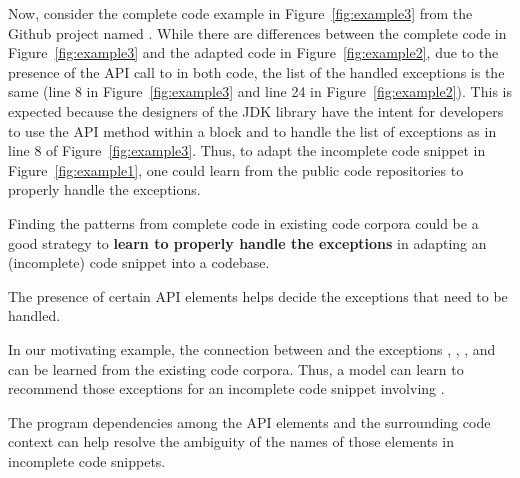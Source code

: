 




Now, consider the complete code example in Figure~\ref{fig:example3}
from the Github project named . While there are
differences between the complete code in Figure~\ref{fig:example3} and
the adapted code in Figure~\ref{fig:example2}, due to the presence of
the API call to  in both code, the list of
the handled exceptions is the same (line 8 in
Figure~\ref{fig:example3} and line 24 in
Figure~\ref{fig:example2}). This is expected because the designers of
the JDK library have the intent for developers to use the API method
 within a  block and to
handle the list of exceptions as in line 8 of
Figure~\ref{fig:example3}. Thus, to adapt the incomplete code snippet
in Figure~\ref{fig:example1}, one could learn from the public code
repositories to properly handle the exceptions.

\begin{Observation} 
\label{ob2}
Finding the patterns from complete code in existing code corpora could
be a good strategy to {\bf learn to properly handle the exceptions} in
adapting an (incomplete) code snippet into a codebase.
\end{Observation}

\begin{Observation} 
\label{ob3}
The presence of certain API elements helps decide the exceptions that
need to be handled.
\end{Observation}

In our motivating example, the connection between
 and the exceptions
, ,
, and
 can be learned from the existing
code corpora. Thus, a model can learn to recommend those exceptions
for an incomplete code snippet involving .

\begin{Observation} 
\label{ob4}
The program dependencies among the API elements and the surrounding
code context can help resolve the ambiguity of the names of those
elements in incomplete code snippets.
\end{Observation}

